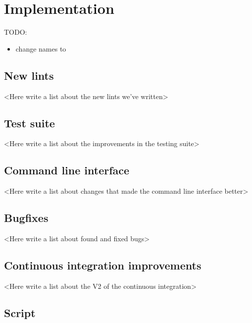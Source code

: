 \documentclass[licencjacka,en]{pracamgr}
\begin{document}

\chapter{Implementation}\label{r:chapter_implementation}

TODO:
\begin{itemize}
	\item change names to 
\end{itemize}

\section{New lints}\label{r:section_new_lints}

<Here write a list about the new lints we've written>

\section{Test suite}\label{r:section_test_suite}

<Here write a list about the improvements in the testing suite>

\section{Command line interface}\label{r:section_cli}

<Here write a list about changes that made the command line interface better>

\section{Bugfixes}\label{r:section_bugfixes}

<Here write a list about found and fixed bugs>

\section{Continuous integration improvements}\label{r:section_continuous_integration_improvements}

<Here write a list about the V2 of the continuous integration>

\section{Script}\label{r:section_script_implementation}
\end{document}
